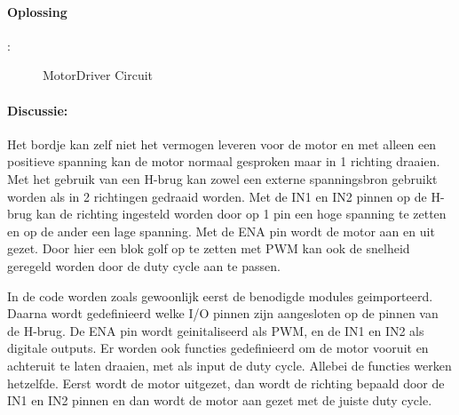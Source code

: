 \paragraph{Oplossing}:

	\begin{figure}[H]
		\caption{MotorDriver Circuit}
		\label{fig:MotorDriver}
	\end{figure}
\newpage
		

	

\paragraph{Discussie:} Het bordje kan zelf niet het vermogen leveren voor de motor en met alleen een positieve spanning kan de motor normaal gesproken maar in 1 richting draaien. Met het gebruik van een H-brug kan zowel een externe spanningsbron gebruikt worden als in 2 richtingen gedraaid worden. Met de IN1 en IN2 pinnen op de H-brug kan de richting ingesteld worden door op 1 pin een hoge spanning te zetten en op de ander een lage spanning. Met de ENA pin wordt de motor aan en uit gezet. Door hier een blok golf op te zetten met PWM kan ook de snelheid geregeld worden door de duty cycle aan te passen. 

In de code worden zoals gewoonlijk eerst de benodigde modules geimporteerd. Daarna wordt gedefinieerd welke I/O pinnen zijn aangesloten op de pinnen van de H-brug. De ENA pin wordt geinitaliseerd als PWM, en de IN1 en IN2 als digitale outputs. Er worden ook functies gedefinieerd om de motor vooruit en achteruit te laten draaien, met als input de duty cycle. Allebei de functies werken hetzelfde. Eerst wordt de motor uitgezet, dan wordt de richting bepaald door de IN1 en IN2 pinnen en dan wordt de motor aan gezet met de juiste duty cycle.

